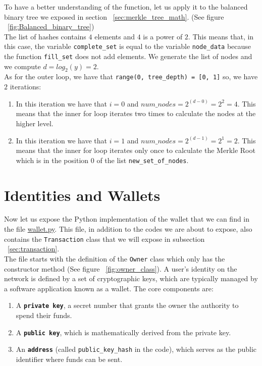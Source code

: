 \documentclass{scrbook}
\begin{document}
To have a better understanding of the function, let us apply it to the balanced binary tree we exposed in section ~\ref{sec:merkle_tree_math}. (See figure ~\ref{fig:Balanced_binary_tree}) \\

The list of hashes contains $4$ elements and $4$ is a power of $2$. This means that, in this case, the variable \texttt{complete\_set} is equal to the variable \texttt{node\_data} because the function \texttt{fill\_set} does not add elements. We generate the list of nodes and we compute $d = log_2(y) = 2$. \\

As for the outer loop, we have that \texttt{range(0, tree\_depth) = [0, 1]} so, we have $2$ iterations:

\begin{enumerate}
    \item In this iteration we have that $i=0$ and $num\_nodes = 2^{(d-0)} = 2^2 = 4$. This means that the inner for loop iterates two times to calculate the nodes at the higher level.

    \item In this iteration we have that $i=1$ and $num\_nodes = 2^{(d-1)} = 2^1 = 2$. This means that the inner for loop iterates only once to calculate the Merkle Root which is in the position $0$ of the list \texttt{new\_set\_of\_nodes}.
\end{enumerate}

\section{Identities and Wallets}

Now let us expose the Python implementation of the wallet that we can find in the file \href{https://github.com/gruyaume/my-blockchain/blob/utxo/src/wallet/wallet.py}{wallet.py}. This file, in addition to the codes we are about to expose, also contains the \texttt{Transaction} class that we will expose in subsection ~\ref{sec:transaction}. \\

The file starts with the definition of the \texttt{Owner} class which only has the constructor method (See figure ~\ref{fig:owner_class}). A user's identity on the network is defined by a set of cryptographic keys, which are typically managed by a software application known as a wallet. The core components are:

\begin{enumerate}
    \item A \texttt{\textbf{private key}}, a secret number that grants the owner the authority to spend their funds.
    \item A \texttt{\textbf{public key}}, which is mathematically derived from the private key.
    \item An \texttt{\textbf{address}} (called \texttt{public\_key\_hash} in the code), which serves as the public identifier where funds can be sent.
\end{enumerate}
\end{document}
